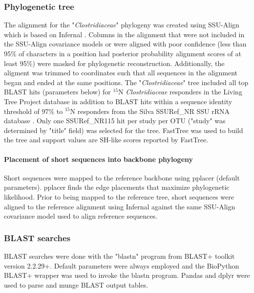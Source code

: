 \subsubsection{Phylogenetic tree}
The alignment for the "\textit{Clostridiaceae}" phylogeny was created using
SSU-Align which is based on Infernal \citep{24008419, 19307242}. Columns in the
alignment that were not included in the SSU-Align covariance models or were
aligned with poor confidence (less than 95\% of characters in a position had
posterior probability alignment scores of at least 95\%) were masked for
phylogenetic reconstruction. Additionally, the aligment was trimmed to
coordinates such that all sequences in the alignment began and ended at the
same positions. The "\textit{Clostridiaceae}" tree included all top BLAST hits
(parameters below) for $^{15}$N \textit{Clostridiaceae} responders in the
Living Tree Project database \citep{Yarza_2008} in addition to BLAST hits
within a sequence identity
threshold of 97\% to $^{15}$N responders from the Silva SSURef\_NR SSU rRNA
database \citep{17947321}. Only one SSURef\_NR115 hit per study per OTU
("study" was determined by "title" field) was selected for the tree. FastTree
\citep{20224823} was used to build the tree and support values are
SH-like scores reported by FastTree.

\paragraph{Placement of short sequences into backbone phylogeny}
Short sequences were mapped to the reference backbone using pplacer
\citep{Matsen_2010} (default parameters). pplacer finds the edge placements
that maximize phylogenetic likelihood. Prior to being mapped to the reference
tree, short sequences were aligned to the reference alignment using Infernal
\citep{19307242} against the same SSU-Align covariance model used to align
reference sequences.

\subsubsection{BLAST searches}
BLAST searches were done with the "blastn" program from BLAST+ toolkit
\citep{20003500} version 2.2.29+. Default parameters were always employed and
the BioPython \citep{19304878} BLAST+ wrapper was used to invoke the blastn
program. Pandas \citep{citeulike:11241428} and dplyr \citep{dplyr} were used to
parse and munge BLAST output tables.  

